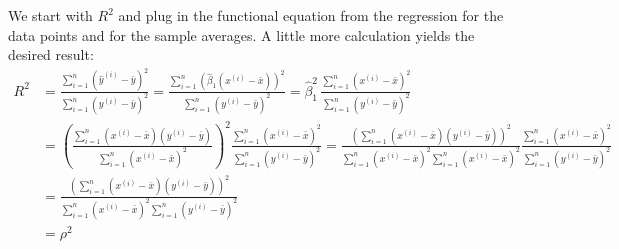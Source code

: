 {%
We start with $R^2$ and plug in the functional equation from the regression for the data points and for the sample averages. A little more calculation yields the desired result:
\begin{align*}
	R^2
    &= \frac{\sum_{i=1}^n (\hat{y}^{(i)} - \bar{y})^2}{\sum_{i=1}^n (y^{(i)} - \bar{y})^2}
    = \frac{ \sum_{i=1}^n (\hat{\beta}_1 (x^{(i)} - \bar{x}))^2}{\sum_{i=1}^n (y^{(i)} - \bar{y})^2}
    = \hat{\beta}_1^2 \, \frac{\sum_{i=1}^n (x^{(i)} - \bar{x})^2}{\sum_{i=1}^n (y^{(i)} - \bar{y})^2}  \\
    &= \left(\frac{\sum_{i=1}^n (x^{(i)} - \bar{x})(y^{(i)} - \bar{y})}{\sum_{i=1}^n (x^{(i)} - \bar{x})^2}\right)^2 \frac{\sum_{i=1}^n (x^{(i)} - \bar{x})^2}{\sum_{i=1}^n (y^{(i)} - \bar{y})^2} 
    = \frac{ \left( \sum_{i=1}^n (x^{(i)} - \bar{x})(y^{(i)} - \bar{y}) \right)^2 }{\sum_{i=1}^n (x^{(i)} - \bar{x})^2 \sum_{i=1}^n (x^{(i)} - \bar{x})^2} \frac{\sum_{i=1}^n (x^{(i)} - \bar{x})^2}{\sum_{i=1}^n (y^{(i)} - \bar{y})^2} \\
    &= \frac{\left(\sum_{i=1}^n (x^{(i)} - \bar{x})(y^{(i)} - \bar{y})\right)^2}{\sum_{i=1}^n (x^{(i)} - \bar{x})^2\sum_{i=1}^n (y^{(i)} - \bar{y})^2} \\
    &= \rho^2
\end{align*}


}
